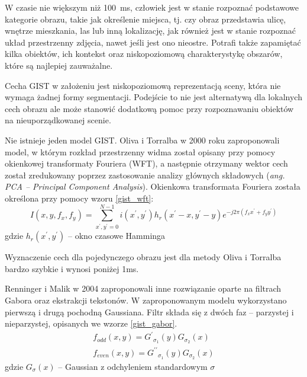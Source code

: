 W czasie nie większym niż 100~ms, człowiek jest w stanie rozpoznać podstawowe kategorie obrazu, takie jak określenie miejsca, tj. czy obraz przedstawia ulicę, wnętrze mieszkania, las lub inną lokalizację\cite{POTTER76}, jak również jest w stanie rozpoznać układ przestrzenny zdjęcia, nawet jeśli jest ono nieostre.\cite{SCHYNS94} Potrafi także zapamiętać kilka obiektów, ich kontekst oraz niskopoziomową charakterystykę obszarów, które są najlepiej zauważalne.\cite{OLIVA05}

Cecha GIST w założeniu jest niskopoziomową reprezentacją sceny, która nie wymaga żadnej formy segmentacji. Podejście to nie jest alternatywą dla lokalnych cech obrazu ale może stanowić dodatkową pomoc przy rozpoznawaniu obiektów na nieuporządkowanej scenie.\cite{OLIVA06}

Nie istnieje jeden model GIST. Oliva i Torralba w 2000 roku zaproponowali model, w którym rozkład przestrzenny widma został opisany przy pomocy okienkowej transformaty Fouriera (WFT), a następnie otrzymany wektor cech został zredukowany poprzez zastosowanie analizy głównych składowych (\emph{ang. PCA -- Principal Component Analysis}).\cite{OLIVA00} Okienkowa transformata Fouriera została określona przy pomocy wzoru \ref{gist_wft}:
\begin{equation} 
\label{gist_wft} 
I(x, y, f_x, f_y) = \sum\limits_{x^\prime, y^\prime = 0}^{N-1} i(x^\prime, y^\prime)h_r(x^\prime - x, y^\prime - y)e^{-j2\pi(f_xx^\prime+f_yy^\prime)}
\end{equation} gdzie $h_r(x^\prime, y^\prime)$ -- okno czasowe Hamminga

Wyznaczenie cech dla pojedynczego obrazu jest dla metody Oliva i Torralba bardzo szybkie i wynosi poniżej 1ms.

Renninger i Malik w 2004 zaproponowali inne rozwiązanie oparte na filtrach Gabora oraz ekstrakcji tekstonów. W zaproponowanym modelu wykorzystano pierwszą i drugą pochodną Gaussiana. Filtr składa się z dwóch faz -- parzystej i nieparzystej, opisanych we wzorze \ref{gist_gabor}.
\begin{equation} 
\label{gist_gabor} 
	\begin{gathered}
		f_{odd}(x, y) = {G^\prime}_{\sigma_1}(y) G_{\sigma_2}(x) \\
		f_{even}(x, y) = {G^{\prime\prime}}_{\sigma_1}(y) G_{\sigma_2}(x) 
	\end{gathered}
\end{equation} gdzie $G_\sigma(x)$ -- Gaussian z odchyleniem standardowym $\sigma$

